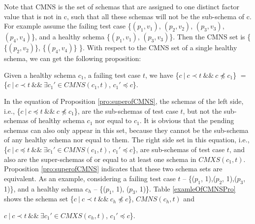 \documentclass{sig-alternate-05-2015}
\begin{document}
{Note that CMNS is the set of schemas that are assigned to one distinct factor value that is not in c, such that all these schemas will not be the sub-schema of c. For example assume the failing test case \{$(p_{1}, v_{1})$, $(p_{2}, v_{2})$, $(p_{3}, v_{3})$, $(p_{4}, v_{4})$\}, and a healthy schema \{$(p_{1}, v_{1})$, $(p_{3}, v_{3})$\}. Then the CMNS set is \{ \{$(p_{2}, v_{2})$\}, \{$(p_{4}, v_{4})$\} \}.  With respect to the CMNS set of a single healthy schema, we can get the following proposition:

\begin{proposition}\label{pro:superofCMNS}
Given a healthy schema $c_{1}$, a failing test case $t$, we have \{$c\ |\ c \prec t\ \&\&\ c \npreceq c_{1}$\} $=$  \{$ c\ |\ c \prec t \  \&\& \ \exists c_{1}' \in CMNS(c_{1}, t)$, $c_{1}' \preceq c$\}.
\end{proposition}

In the equation of Proposition \ref{pro:superofCMNS}, the schemas of the left side, i.e., \{$c\ |\ c \preceq t\ \&\&\ c \npreceq c_{1}$\}, are the sub-schemas of test case $t$, but not the sub-schemas of healthy schema $c_{1}$ nor equal to $c_{1}$.  It is obvious that the pending schemas can also only appear in this set, because they cannot be the sub-schema of any healthy schema nor equal to them. The right side set in this equation, i.e.,\{$ c\ |\ c \preceq t \  \&\& \ \exists c_{1}' \in CMNS(c_{1}, t)$, $c_{1}' \preceq c$\}, are sub-schemas of test case $t$, and also are the super-schemas of or equal to at least one schema in $CMXS(c_{1}, t)$. Proposition \ref{pro:superofCMNS} indicates that these two schema sets are equivalent. As an example, considering a failing test case $t$ -- \{($p_{1}$, 1),($p_{2}$, 1),($p_{3}$, 1)\}, and a healthy schema $c_{h}$ --  \{($p_{1}$, 1), ($p_{3}$, 1)\}. Table \ref{examleOfCMNSPro} shows the schema set  \{$c\ |\ c \prec t\ \&\&\ c_{h} \npreceq c$\}, $CMNS(c_{h}, t)$ and {$ c\ |\ c \prec t\ \&\& \ \exists c_{1}' \in CMXS(c_{h}, t)$, $c_{1}' \preceq c$\}.

}}
\end{document}
